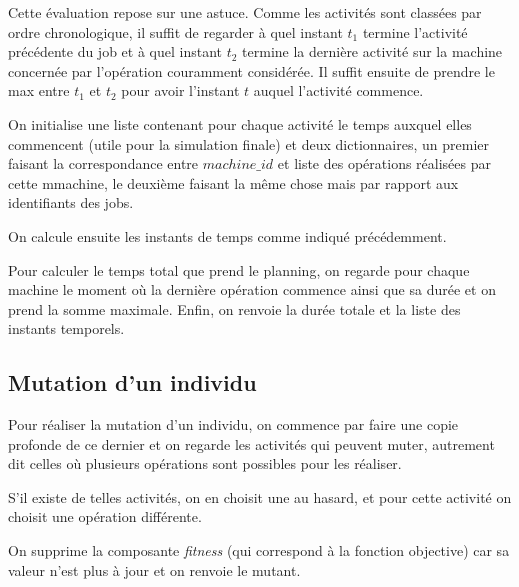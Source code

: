 Cette évaluation repose sur une astuce. Comme les activités sont classées par ordre chronologique, il suffit de regarder à quel instant $t_1$ termine l'activité précédente du job et à quel instant $t_2$ termine la dernière activité sur la machine concernée par l'opération couramment considérée. Il suffit ensuite de prendre le max entre $t_1$ et $t_2$ pour avoir l'instant $t$ auquel l'activité commence.



On initialise une liste contenant pour chaque activité le temps auxquel elles commencent (utile pour la simulation finale) et deux dictionnaires, un premier faisant la correspondance entre $machine\_id$ et liste des opérations réalisées par cette mmachine, le deuxième faisant la même chose mais par rapport aux identifiants des jobs.



On calcule ensuite les instants de temps comme indiqué précédemment.



Pour calculer le temps total que prend le planning, on regarde pour chaque machine le moment où la dernière opération commence ainsi que sa durée et on prend la somme maximale. Enfin, on renvoie la durée totale et la liste des instants temporels.

\subsection{Mutation d'un individu}



Pour réaliser la mutation d'un individu, on commence par faire une copie profonde de ce dernier et on regarde les activités qui peuvent muter, autrement dit celles où plusieurs opérations sont possibles pour les réaliser.



S'il existe de telles activités, on en choisit une au hasard, et pour cette activité on choisit une opération différente. 



On supprime la composante \textit{fitness} (qui correspond à la fonction objective) car sa valeur n'est plus à jour et on renvoie le mutant.

